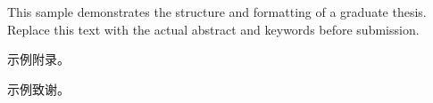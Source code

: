 \documentclass{xmu-graduate}
\begin{document}
\maketitle

\makeoriginality

\makecopyright

\makeaideclaration

\begin{abstract}
本示例展示研究生论文的结构和格式。正式论文应按学校要求撰写约六百字中文摘要，并按实际研究内容填写关键词。
\end{abstract}

\begin{enabstract}
This sample demonstrates the structure and formatting of a graduate thesis. Replace this text with the actual abstract and keywords before submission.
\end{enabstract}

\tableofcontents




\begin{reference}

\end{reference}

\begin{appendix}
示例附录。
\end{appendix}

\begin{acknowledgement}
示例致谢。
\end{acknowledgement}

\makecommittee

\end{document}
